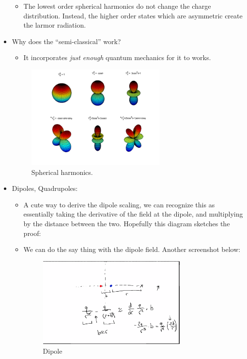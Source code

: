 \documentclass{article}
\begin{document}
\begin{itemize}
\begin{itemize}
        \item The lowest order spherical harmonics do not change the charge distribution. Instead, the higher order states which are asymmetric create the larmor radiation. 
    \end{itemize}
    
    \item Why does the ``semi-classical'' work?
    \begin{itemize}
        \item It incorporates \textit{just enough} quantum mechanics for it to works. 
    \end{itemize}
    
    \begin{figure}
        \centering
        \includegraphics[width = 0.66\textwidth]{figures/sphericalharmonics.png}
        \caption{Spherical harmonics.}
        \label{fig:SH}
    \end{figure}
    
    \item Dipoles, Quadrupoles:
    \begin{itemize}
        \item A cute way to derive the dipole scaling, we can recognize this as essentially taking the derivative of the field at the dipole, and multiplying by the distance between the two. Hopefully this diagram sketches the proof:
        
        \item We can do the say thing with the dipole field. Another screenshot below: 
        
        \begin{figure}
            \centering
            \includegraphics[width=0.75\textwidth]{figures/Screen Shot 2020-09-15 at 12.18.39 PM.png}
            \caption{Dipole}
            \label{fig:dip}
        \end{figure}
        

\end{itemize}
\end{itemize}
\end{document}
